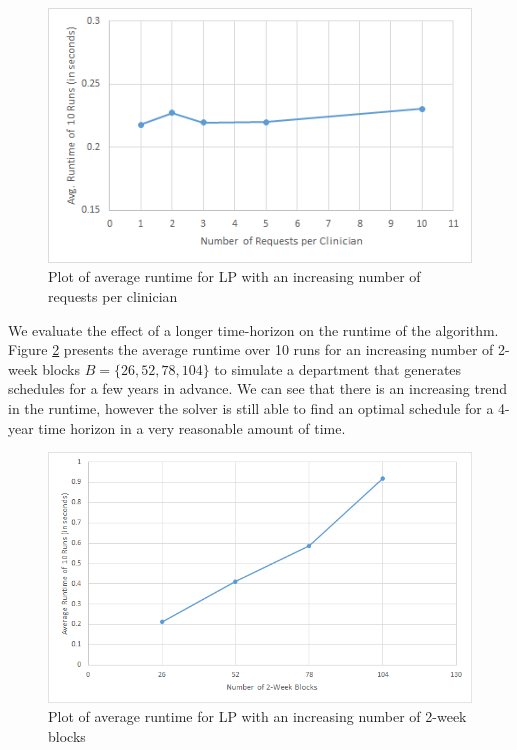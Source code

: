 \begin{figure}[h]
	\centering
	\includegraphics[scale=.7]{fig/avg_runtime_requests}
	\caption{Plot of average runtime for LP with an increasing number of requests per clinician}
	\label{fig:avg-runtime-requests}
\end{figure}

We evaluate the effect of a longer time-horizon on the runtime of the algorithm. Figure \ref{fig:avg-runtime-blocks} presents the average runtime over 10 runs for an increasing number of 2-week blocks $B = \{26, 52, 78, 104\}$ to simulate a department that generates schedules for a few years in advance. We can see that there is an increasing trend in the runtime, however the solver is still able to find an optimal schedule for a 4-year time horizon in a very reasonable amount of time. \\

\begin{figure}[h]
	\centering
	\includegraphics[scale=.7]{fig/avg_runtime_blocks}
	\caption{Plot of average runtime for LP with an increasing number of 2-week blocks}
	\label{fig:avg-runtime-blocks}
\end{figure}

